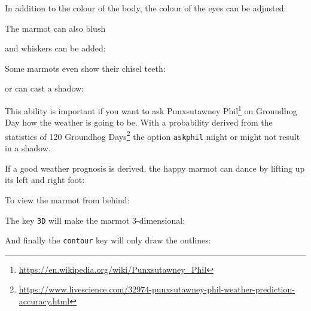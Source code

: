\documentclass[parskip=half]{scrartcl}
\begin{document}
In addition to the colour of the body, the colour of the eyes can be adjusted:
\begin{tcblisting}{}
\marmot[eye=red]
\end{tcblisting}

The marmot can also blush
\begin{tcblisting}{}
\marmot[blush]
\end{tcblisting}

and whiskers can be added:
\begin{tcblisting}{}
\marmot[whiskers=gray]
\end{tcblisting}

Some marmots even show their chisel teeth:
\begin{tcblisting}{}
\marmot[teeth=white]
\end{tcblisting}

or can cast a shadow:
\begin{tcblisting}{}
\marmot[shadow]
\end{tcblisting}

This ability is important if you want to ask Punxsutawney Phil\footnote{\url{https://en.wikipedia.org/wiki/Punxsutawney_Phil}} on Groundhog Day how the weather is going to be. With a probability derived from the statistics of 120 Groundhog Days\footnote{\url{https://www.livescience.com/32974-punxsutawney-phil-weather-prediction-accuracy.html}} the option \lstinline|askphil| might or might not result in a shadow.
\begin{tcblisting}{}
\marmot[askphil]
\end{tcblisting}

If a good weather prognosis is derived, the happy marmot can dance by lifting up its left and right foot: 
\begin{tcblisting}{}
\marmot[leftstep]
\marmot[rightstep,xshift=2cm]
\end{tcblisting}

To view the marmot from behind:
\begin{tcblisting}{}
\marmot[back]
\end{tcblisting}

The key \lstinline|3D| will make the marmot 3-dimensional:
\begin{tcblisting}{}
\marmot[3D]
\end{tcblisting}

And finally the \lstinline|contour| key will only draw the outlines:
\begin{tcblisting}{}
\marmot[contour=black]
\end{tcblisting}
\end{document}
